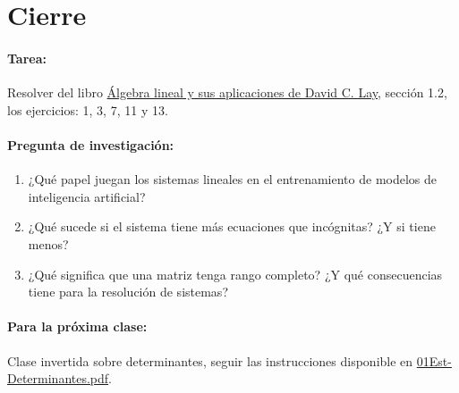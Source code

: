 \documentclass[a4,11pt]{aleph-notas}
\begin{document}
\section*{Cierre}  

\paragraph{Tarea:}  
Resolver del libro \href{https://catalogobiblioteca.puce.edu.ec/cgi-bin/koha/opac-detail.pl?biblionumber=86083&query_desc=kw%2Cwrdl%3A%20%C3%81lgebra%20lineal%20y%20sus%20aplicaciones}{Álgebra lineal y sus aplicaciones de David C. Lay}, sección 1.2, los ejercicios: 1, 3, 7, 11 y 13.

\paragraph{Pregunta de investigación:}  
\begin{enumerate}[leftmargin=*]  
    \item ¿Qué papel juegan los sistemas lineales en el entrenamiento de modelos de inteligencia artificial?
    \item ¿Qué sucede si el sistema tiene más ecuaciones que incógnitas? ¿Y si tiene menos?  
    \item ¿Qué significa que una matriz tenga rango completo? ¿Y qué consecuencias tiene para la resolución de sistemas?
\end{enumerate}  

\paragraph{Para la próxima clase:}  
Clase invertida sobre determinantes, seguir las instrucciones disponible en \href{https://fcena-puce.github.io/AlgLinealyGeomAnalitica-05-N0068/2-ClaseInvertida/01Est-Determinantes.pdf}{01Est-Determinantes.pdf}.  
\end{document}
